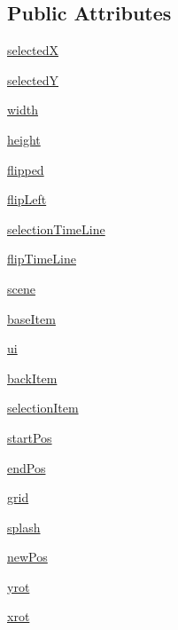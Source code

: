 \subsection*{Public Attributes}
\begin{DoxyCompactItemize}
\item 
\hyperlink{classpadnavigator_1_1Panel_a2921f3f95c205b49d70d41c9ae51126e}{selected\+X}
\item 
\hyperlink{classpadnavigator_1_1Panel_a87b472ff1c634b1081cdc97db7873218}{selected\+Y}
\item 
\hyperlink{classpadnavigator_1_1Panel_a5466e3195b083b58a524372ea499b958}{width}
\item 
\hyperlink{classpadnavigator_1_1Panel_a50155e18fab2954d66e2a25100e78a59}{height}
\item 
\hyperlink{classpadnavigator_1_1Panel_afa6a7a5b74169f2fefb3e14c6a33ee7b}{flipped}
\item 
\hyperlink{classpadnavigator_1_1Panel_a1323ebdd39febdb01a97eca07a7fe47c}{flip\+Left}
\item 
\hyperlink{classpadnavigator_1_1Panel_a6bd10ce18c6c275e0003182cf27e8e11}{selection\+Time\+Line}
\item 
\hyperlink{classpadnavigator_1_1Panel_a747e73f1ebe6fc2fe054b7a3d545a4c9}{flip\+Time\+Line}
\item 
\hyperlink{classpadnavigator_1_1Panel_adbd6d313007ffe9922511f5e50b4b7eb}{scene}
\item 
\hyperlink{classpadnavigator_1_1Panel_ac125161cab17a974c03c69d787a2cbf3}{base\+Item}
\item 
\hyperlink{classpadnavigator_1_1Panel_a9e37bee57811800afbfffb681079c30c}{ui}
\item 
\hyperlink{classpadnavigator_1_1Panel_a99d5532ff1210706ed0263a21e244b1e}{back\+Item}
\item 
\hyperlink{classpadnavigator_1_1Panel_a26a148bb8a93cb5251e270c4454727d6}{selection\+Item}
\item 
\hyperlink{classpadnavigator_1_1Panel_ada83ca2d031827123c8723d228e8909c}{start\+Pos}
\item 
\hyperlink{classpadnavigator_1_1Panel_a539751289c1527dc6d817d45c19fdcbf}{end\+Pos}
\item 
\hyperlink{classpadnavigator_1_1Panel_aa34c380c0ace4421f1c9c18556d6cd6a}{grid}
\item 
\hyperlink{classpadnavigator_1_1Panel_a5c571b18ab2421ddff87d88d653b81e2}{splash}
\item 
\hyperlink{classpadnavigator_1_1Panel_a5ac71122a70e3b4a379e3832ad407bab}{new\+Pos}
\item 
\hyperlink{classpadnavigator_1_1Panel_a49ec5268862f024ca1c8c545307f834e}{yrot}
\item 
\hyperlink{classpadnavigator_1_1Panel_a1af70904e44be11c0d1f4db9a71d197c}{xrot}
\end{DoxyCompactItemize}


